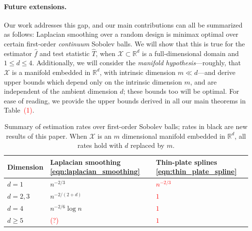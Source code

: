 \documentclass[twoside]{article}
\newcommand{\Reals}{\mathbb{R}}
\newcommand{\1}{\mathbf{1}}
\newcommand{\Rd}{\Reals^d}
\newcommand{\Xset}{\mathcal{X}}
\newcommand{\wh}[1]{\widehat{#1}}
\theoremstyle{definition}
\theoremstyle{remark}
\begin{document}
\paragraph{Future extensions.}






Our work addresses this gap, and our main contributions can all be summarized as follows: Laplacian smoothing over a random design is minimax optimal over certain first-order \emph{continuum} Sobolev balls. We will show that this is true for the estimator $\wh{f}$ and test statistic $\wh{T}$, when $\Xset \subset \Rd$ is a full-dimensional domain and $1 \leq d \leq 4$. Additionally, we will consider the \emph{manifold hypothesis}---roughly, that $\Xset$ is a manifold embedded in $\Rd$, with intrinsic dimension $m \ll d$---and derive upper bounds which depend only on the intrinsic dimension $m$, and are independent of the ambient dimension $d$; these bounds too will be optimal. For ease of reading, we provide the upper bounds derived in all our main theorems in Table~\textcolor{red}{(1)}.

\begin{table}
\begin{center}
\begin{tabular}{p{} | p{} p{} }
	Dimension & Laplacian smoothing \eqref{eqn:laplacian_smoothing} & Thin-plate splines \eqref{eqn:thin_plate_spline} \\
	\hline
	$d = 1$ & $n^{-2/3}$ & \textcolor{red}{$n^{-2/3}$} \\
	$d = 2,3$ & $n^{-2/(2 + d)}$ & \textcolor{red}{$1$} \\
	$d = 4$ & $n^{-2/6}\log n$ & \textcolor{red}{$1$} \\
	$d \geq 5$ & \textcolor{red}{(?)} & \textcolor{red}{$1$} \\
\end{tabular}
\end{center}
\caption{Summary of estimation rates over first-order Sobolev balls; rates in black are new results of this paper. When $\Xset$ is an $m$ dimensional manifold embedded in $\Rd$, all rates hold with $d$ replaced by $m$.}
\label{tbl:estimation_rates}
\end{table}
\end{document}
